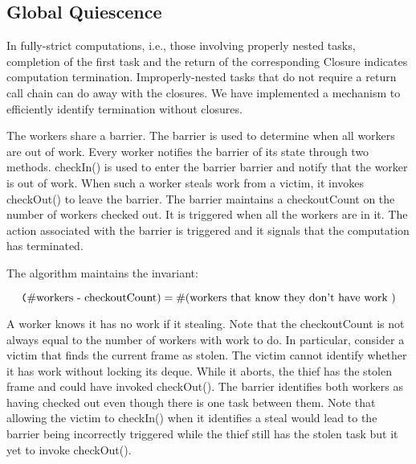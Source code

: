 %
%
%
\subsection{Global Quiescence}

In fully-strict computations, i.e., those involving properly nested
tasks, completion of the first task and the return of the
corresponding Closure indicates computation termination.
Improperly-nested tasks that do not require a return call chain can do
away with the closures. We have implemented a mechanism to efficiently
identify termination without closures.

The workers share a barrier. The barrier is used to determine when all
workers are out of work. Every worker notifies the barrier of its
state through two methods. {\java checkIn()} is used to enter the
barrier barrier and notify that the worker is out of work. When such a
worker steals work from a victim, it invokes {\java checkOut()} to
leave the barrier. The barrier maintains a {\java checkoutCount} on
the number of workers checked out. It is triggered when all the workers
are in it. The action associated with the barrier is triggered and it
signals that the computation has terminated.

The algorithm maintains the invariant:

\[
\mbox{{\texttt (\#workers - checkoutCount)}} = \mbox{\#(workers that know they don't
  have work )}
\]

A worker knows it has no work if it stealing. Note that the
checkoutCount is not always equal to the number of workers with work
to do. In particular, consider a victim that finds the current frame
as stolen. The victim cannot identify whether it has work without
locking its deque. While it aborts, the thief has the stolen
frame and could have invoked {\java checkOut()}. The barrier
identifies both workers as having checked out even though there is one
task between them. Note that allowing the victim to {\java
  checkIn()} when it identifies a steal would lead to the barrier
being incorrectly triggered while the thief still has the stolen task
but it yet to invoke {\java checkOut()}.


